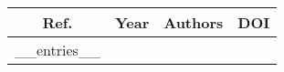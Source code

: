 \begin{tabular}{ccll}
  \hline
  Ref. & Year & Authors & DOI \\
  \hline
__entries__
  \hline
\end{tabular}
